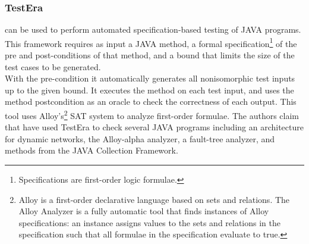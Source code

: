 \documentclass[10pt, conference, compsocconf]{IEEEtran}
\begin{document}
\subsubsection{\textbf{TestEra}\cite{testera}}
can be used to perform automated specification-based testing of
JAVA programs. This framework requires as input a JAVA method, a formal specification\footnote{Specifications are first-order logic formulae.}
of the pre and post-conditions of that method, and a bound that limits the size of the test cases to be generated.\\
With the pre-condition it automatically generates all nonisomorphic test inputs up to the given bound.
It executes the method on each test input, and uses the method postcondition as an oracle to check the correctness of each output. This tool
uses Alloy's\footnote{Alloy is a first-order declarative language based on sets and relations. The Alloy Analyzer is a fully
automatic tool that finds instances of Alloy specifications: an instance
assigns values to the sets and relations in the specification such that
all formulae in the specification evaluate to true.} SAT system to analyze first-order  formulae.
The authors claim that have used TestEra to check several JAVA programs including an architecture for
dynamic networks, the Alloy-alpha analyzer, a fault-tree analyzer, and methods from the JAVA Collection Framework.
\end{document}
